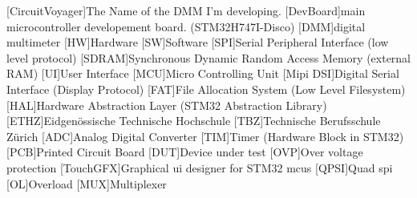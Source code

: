 \begin{acronym}
        [CircuitVoyager]{The Name of the DMM I'm developing.}
        [DevBoard]{main microcontroller developement board. (STM32H747I-Disco)}
        [DMM]{digital multimeter}
        [HW]{Hardware}
        [SW]{Software}
        [SPI]{Serial Peripheral Interface (low level protocol)}
        [SDRAM]{Synchronous Dynamic Random Access Memory (external RAM)}
        [UI]{User Interface}
        [MCU]{Micro Controlling Unit}
        [Mipi DSI]{Digital Serial Interface (Display Protocol)}
        [FAT]{File Allocation System (Low Level Filesystem)}
        [HAL]{Hardware Abstraction Layer (STM32 Abstraction Library)}
        [ETHZ]{Eidgenössische Technische Hochschule}
        [TBZ]{Technische Berufsschule Zürich}
        [ADC]{Analog Digital Converter}
        [TIM]{Timer (Hardware Block in STM32)}
        [PCB]{Printed Circuit Board}
        [DUT]{Device under test}
        [OVP]{Over voltage protection}
        [TouchGFX]{Graphical \acs{ui} designer for STM32 \acs{mcu}s}
        [QPSI]{Quad \acs{spi}}
        [OL]{Overload}
        [MUX]{Multiplexer}
\end{acronym}